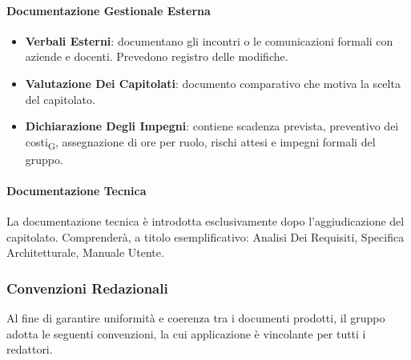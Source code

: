 \paragraph{Documentazione Gestionale Esterna}
\begin{itemize}
  \item \textbf{Verbali Esterni}: documentano gli incontri o le comunicazioni formali
        con aziende e docenti. Prevedono registro delle modifiche.
  \item \textbf{Valutazione Dei Capitolati}: documento comparativo
        che motiva la scelta del capitolato.
  \item \textbf{Dichiarazione Degli Impegni}: contiene scadenza
        prevista, preventivo dei costi\textsubscript{G}, assegnazione di ore per ruolo, rischi attesi
        e impegni formali del gruppo.
\end{itemize}
 
\paragraph{Documentazione Tecnica}
La documentazione tecnica è introdotta esclusivamente dopo l'aggiudicazione del
capitolato. Comprenderà, a titolo esemplificativo: Analisi Dei Requisiti,
Specifica Architetturale, Manuale Utente.
 
\subsubsection{Convenzioni Redazionali}
\label{sec:convenzioni}
 
Al fine di garantire uniformità e coerenza tra i documenti prodotti, il gruppo adotta
le seguenti convenzioni, la cui applicazione è vincolante per tutti i redattori.
 
